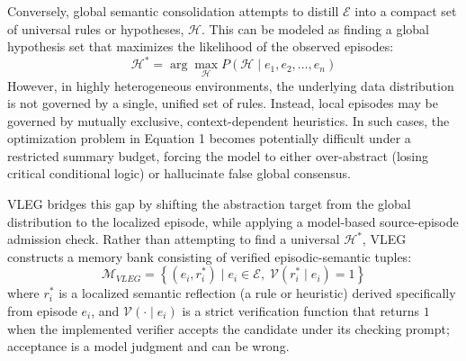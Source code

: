\documentclass[onecolumn]{IEEEtran}
\numberwithin{equation}{section}
\theoremstyle{definition}
\theoremstyle{remark}
\begin{document}
Conversely, global semantic consolidation \cite{agarwal2026hypothesis} attempts to distill $\mathcal{E}$ into a compact set of universal rules or hypotheses, $\mathcal{H}$. This can be modeled as finding a global hypothesis set that maximizes the likelihood of the observed episodes:
\begin{equation}
    \mathcal{H}^* = \arg\max_{\mathcal{H}} P(\mathcal{H} \mid e_1, e_2, \dots, e_n)
\end{equation}
However, in highly heterogeneous environments, the underlying data distribution is not governed by a single, unified set of rules. Instead, local episodes may be governed by mutually exclusive, context-dependent heuristics. In such cases, the optimization problem in Equation 1 becomes potentially difficult under a restricted summary budget, forcing the model to either over-abstract (losing critical conditional logic) or hallucinate false global consensus.

VLEG bridges this gap by shifting the abstraction target from the global distribution to the localized episode, while applying a model-based source-episode admission check. Rather than attempting to find a universal $\mathcal{H}^*$, VLEG constructs a memory bank consisting of verified episodic-semantic tuples:
\begin{equation}
    \mathcal{M}_{VLEG} = \left\{ (e_i, r_i^*) \mid e_i \in \mathcal{E}, \; \mathcal{V}(r_i^* \mid e_i) = 1 \right\}
\end{equation}
where $r_i^*$ is a localized semantic reflection (a rule or heuristic) derived specifically from episode $e_i$, and $\mathcal{V}(\cdot \mid e_i)$ is a strict verification function that returns $1$ when the implemented verifier accepts the candidate under its checking prompt; acceptance is a model judgment and can be wrong.
\end{document}
